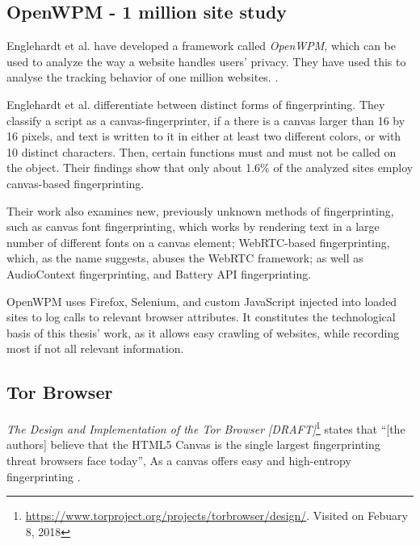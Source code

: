 \documentclass[
    fontsize=12pt,
    headings=small,
    parskip=half,
    bibliography=totoc,
    numbers=noenddot,
    open=any
]{scrreprt}
\begin{document}
\subsection{OpenWPM - 1 million site study}
Englehardt et al. have developed a framework called \textit{OpenWPM}, which can be used to analyze the way a website
handles users' privacy. They have used this to analyse the tracking behavior of one million websites.
\cite{DBLP:conf/ccs/EnglehardtN16,englehardt2016census}.

Englehardt et al. differentiate between distinct forms of fingerprinting.
They classify a script as a canvas-fingerprinter, if a there is a canvas larger than 16 by 16 pixels, and text is
written to it in either at least two different colors, or with 10 distinct characters. Then, certain functions
must and must not be called on the object. Their findings show that only about 1.6\% of the analyzed sites
employ canvas-based fingerprinting.

Their work also examines new, previously unknown methods of fingerprinting, such as canvas font fingerprinting, which
works by rendering text in a large number of different fonts on a canvas element; WebRTC-based fingerprinting, which,
as the name suggests, abuses the WebRTC framework; as well as AudioContext fingerprinting, and Battery API fingerprinting.

OpenWPM uses Firefox, Selenium, and custom JavaScript injected into loaded sites to log calls to relevant browser attributes.
It constitutes the technological basis of this thesis' work, as it allows easy crawling of websites, while recording
most if not all relevant information.


\subsection{Tor Browser}
\textit{The Design and Implementation of the Tor Browser [DRAFT]}\footnote{\url{https://www.torproject.org/projects/torbrowser/design/}. Visited on Febuary 8, 2018}
states that ``[the authors] believe that the HTML5 Canvas is the single largest fingerprinting threat browsers face today'',
As a canvas offers easy and high-entropy fingerprinting \cite{acar2014web,mowery2012pixel}.
\end{document}
